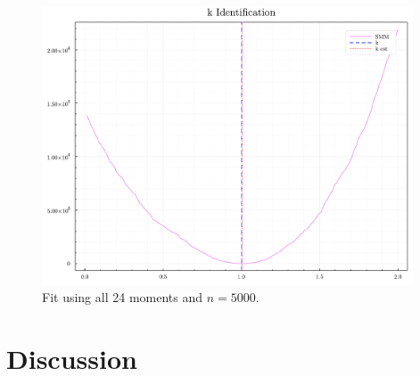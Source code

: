 \documentclass[12pt]{article}
\theoremstyle{definition}
\begin{document}
\begin{figure}[h]
\centering
\includegraphics[width=11cm]{MonteCarlo_final/imgs/kfit_n5000_m24.pdf}
\caption{Fit using all 24 moments and $n = 5000.$}
\end{figure}


\section{Discussion}
\end{document}
